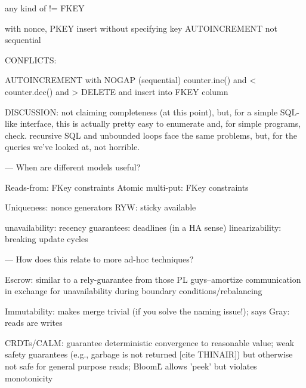 any kind of !=
FKEY

with nonce, PKEY insert without specifying key
AUTOINCREMENT not sequential

CONFLICTS:

AUTOINCREMENT with NOGAP (sequential)
counter.inc() and <
counter.dec() and >
DELETE and insert into FKEY column


DISCUSSION: not claiming completeness (at this point), but, for a
simple SQL-like interface, this is actually pretty easy to enumerate
and, for simple programs, check. recursive SQL and unbounded loops
face the same problems, but, for the queries we've looked at, not
horrible.

---
When are different models useful?

Reads-from: FKey constraints
Atomic multi-put: FKey constraints

Uniqueness: nonce generators
RYW: sticky available

unavailability:
recency guarantees: deadlines (in a HA sense)
linearizability: breaking update cycles

---
How does this relate to more ad-hoc techniques?

Escrow: similar to a rely-guarantee from those PL guys--amortize
communication in exchange for unavailability during boundary
conditions/rebalancing

Immutability: makes merge trivial (if you solve the naming issue!);
says Gray: reads are writes

CRDTs/CALM: guarantee deterministic convergence to reasonable value;
weak safety guarantees (e.g., garbage is not returned [cite THINAIR])
but otherwise not safe for general purpose reads; Bloom\^L allows
'peek' but violates monotonicity
